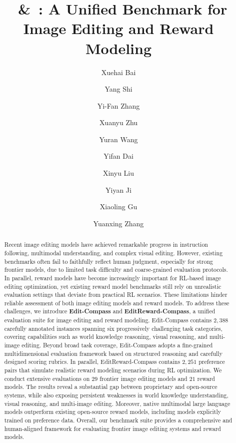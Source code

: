 \documentclass{llmxive}
\title{\bench~\&~\rmbench: A Unified Benchmark for Image Editing and Reward Modeling}
\author{Xuehai Bai \and Yang Shi \and Yi-Fan Zhang \and Xuanyu Zhu \and Yuran Wang \and Yifan Dai \and Xinyu Liu \and Yiyan Ji \and Xiaoling Gu \and Yuanxing Zhang}
\providecommand{\bench}{Edit-Compass}
\providecommand{\rmbench}{EditReward-Compass}
\begin{document}
\maketitle
\begin{abstract}
Recent image editing models have achieved remarkable progress in instruction following, multimodal understanding, and complex visual editing. However, existing benchmarks often fail to faithfully reflect human judgment, especially for strong frontier models, due to limited task difficulty and coarse-grained evaluation protocols. In parallel, reward models have become increasingly important for RL-based image editing optimization, yet existing reward model benchmarks still rely on unrealistic evaluation settings that deviate from practical RL scenarios. These limitations hinder reliable assessment of both image editing models and reward models.
To address these challenges, we introduce \textbf{{\bench}} and \textbf{{\rmbench}}, a unified evaluation suite for image editing and reward modeling. {\bench} contains $2,388$ carefully annotated instances spanning six progressively challenging task categories, covering capabilities such as world knowledge reasoning, visual reasoning, and multi-image editing. Beyond broad task coverage, {\bench} adopts a fine-grained multidimensional evaluation framework based on structured reasoning and carefully designed scoring rubrics. In parallel, {\rmbench} contains $2,251$ preference pairs that simulate realistic reward modeling scenarios during RL optimization.
We conduct extensive evaluations on $29$ frontier image editing models and $21$ reward models. The results reveal a substantial gap between proprietary and open-source systems, while also exposing persistent weaknesses in world knowledge understanding, visual reasoning, and multi-image editing. Moreover, native multimodal large language models outperform existing open-source reward models, including models explicitly trained on preference data. Overall, our benchmark suite provides a comprehensive and human-aligned framework for evaluating frontier image editing systems and reward models.
\end{abstract}
\end{document}
